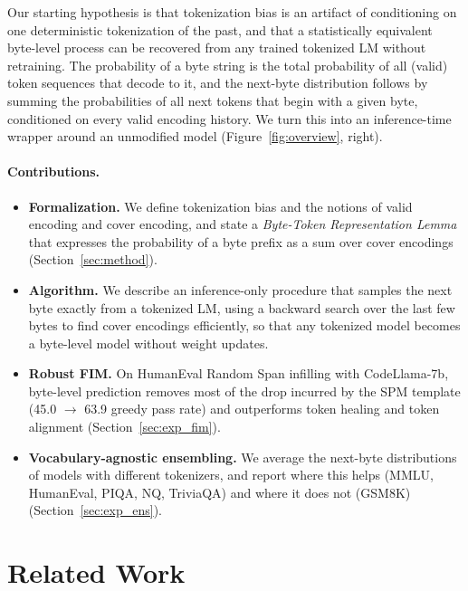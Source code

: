 \documentclass{article} %
\begin{document}
Our starting hypothesis is that tokenization bias is an artifact of conditioning on one deterministic tokenization of the past, and that a statistically equivalent byte-level process can be recovered from any trained tokenized LM without retraining. The probability of a byte string is the total probability of all (valid) token sequences that decode to it, and the next-byte distribution follows by summing the probabilities of all next tokens that begin with a given byte, conditioned on every valid encoding history. We turn this into an inference-time wrapper around an unmodified model (Figure~\ref{fig:overview}, right).

\paragraph{Contributions.}
\begin{itemize}
\item \textbf{Formalization.} We define tokenization bias and the notions of valid encoding and cover encoding, and state a \emph{Byte-Token Representation Lemma} that expresses the probability of a byte prefix as a sum over cover encodings (Section~\ref{sec:method}).
\item \textbf{Algorithm.} We describe an inference-only procedure that samples the next byte exactly from a tokenized LM, using a backward search over the last few bytes to find cover encodings efficiently, so that any tokenized model becomes a byte-level model without weight updates.
\item \textbf{Robust FIM.} On HumanEval Random Span infilling with CodeLlama-7b, byte-level prediction removes most of the drop incurred by the SPM template (45.0 $\rightarrow$ 63.9 greedy pass rate) and outperforms token healing and token alignment (Section~\ref{sec:exp_fim}).
\item \textbf{Vocabulary-agnostic ensembling.} We average the next-byte distributions of models with different tokenizers, and report where this helps (MMLU, HumanEval, PIQA, NQ, TriviaQA) and where it does not (GSM8K) (Section~\ref{sec:exp_ens}).
\end{itemize}

\section{Related Work}
\label{sec:related_work}
\end{document}
